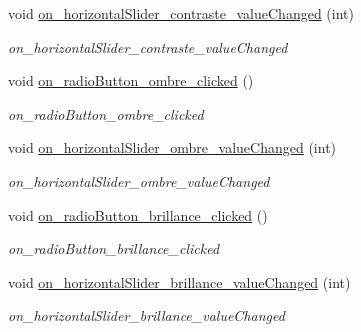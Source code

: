 \begin{DoxyCompactItemize}
\mbox{\label{classMainWindow_adb1efa488197404fc8e27cd0864348bd}} 
void \hyperlink{classMainWindow_adb1efa488197404fc8e27cd0864348bd}{on\+\_\+horizontal\+Slider\+\_\+contraste\+\_\+value\+Changed} (int)
\begin{DoxyCompactList}\small\item\em on\+\_\+horizontal\+Slider\+\_\+contraste\+\_\+value\+Changed \end{DoxyCompactList}\item 
\mbox{\label{classMainWindow_ab70e3fe99b0d5341caf390b77a7f139b}} 
void \hyperlink{classMainWindow_ab70e3fe99b0d5341caf390b77a7f139b}{on\+\_\+radio\+Button\+\_\+ombre\+\_\+clicked} ()
\begin{DoxyCompactList}\small\item\em on\+\_\+radio\+Button\+\_\+ombre\+\_\+clicked \end{DoxyCompactList}\item 
\mbox{\label{classMainWindow_ac0eee404a887a264d0c7b7f5e2fd5c16}} 
void \hyperlink{classMainWindow_ac0eee404a887a264d0c7b7f5e2fd5c16}{on\+\_\+horizontal\+Slider\+\_\+ombre\+\_\+value\+Changed} (int)
\begin{DoxyCompactList}\small\item\em on\+\_\+horizontal\+Slider\+\_\+ombre\+\_\+value\+Changed \end{DoxyCompactList}\item 
\mbox{\label{classMainWindow_ad4ac905771cedf7d802d6ce7b0fa242e}} 
void \hyperlink{classMainWindow_ad4ac905771cedf7d802d6ce7b0fa242e}{on\+\_\+radio\+Button\+\_\+brillance\+\_\+clicked} ()
\begin{DoxyCompactList}\small\item\em on\+\_\+radio\+Button\+\_\+brillance\+\_\+clicked \end{DoxyCompactList}\item 
\mbox{\label{classMainWindow_a2f09785d376668bf1df5508753e3a66d}} 
void \hyperlink{classMainWindow_a2f09785d376668bf1df5508753e3a66d}{on\+\_\+horizontal\+Slider\+\_\+brillance\+\_\+value\+Changed} (int)
\begin{DoxyCompactList}\small\item\em on\+\_\+horizontal\+Slider\+\_\+brillance\+\_\+value\+Changed \end{DoxyCompactList}\item 

\end{DoxyCompactItemize}
